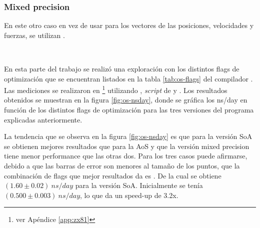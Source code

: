 \documentclass[a4paper,spanish,12pt,twoside]{article}
\begin{document}
\subsubsection*{Mixed precision}

En este otro caso en vez de usar  para los vectores de las posiciones, velocidades y fuerzas, se utilizan .

\

En esta parte del trabajo se realizó una exploración con los distintos flags de optimización que se encuentran listados en la tabla \ref{tab:os-flags} del compilador . Las mediciones se realizaron en \footnote{ver Apéndice \ref{app:zx81}} utilizando , \textit{script} de  y . Los resultados obtenidos se muestran en la figura \ref{fig:os-nsday}, donde se gráfica los ns/day en función de los distintos flags de optimización para las tres versiones del programa explicadas anteriormente.

La tendencia que se observa en la figura \ref{fig:os-nsday} es que para la versión SoA se obtienen mejores resultados que para la AoS y que la versión mixed precision tiene menor performance que las otras dos. Para los tres casos puede afirmarse, debido a que las barras de error son menores al tamaño de los puntos, que la combinación de flags que mejor resultados da es . De la cual se obtiene $(1.60 \pm 0.02)\ ns/day$ para la versión SoA. Inicialmente se tenía $(0.500 \pm 0.003)\ ns/day$, lo que da un speed-up de 3.2x.
\end{document}
